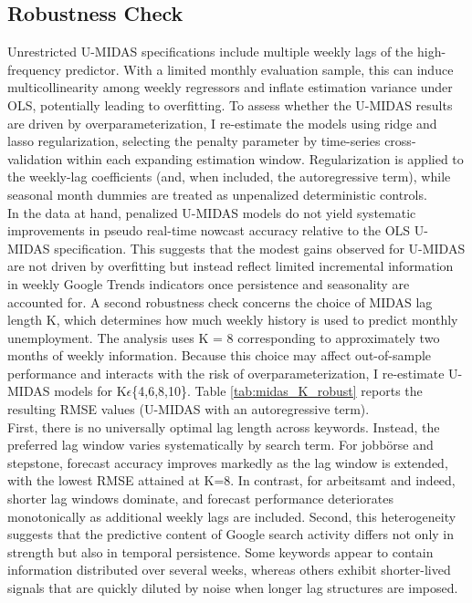 \documentclass[12pt,a4paper]{article}
\begin{document}
\subsection{Robustness Check}
Unrestricted U-MIDAS specifications include multiple weekly lags of the high-frequency predictor. With a limited monthly evaluation sample, this can induce multicollinearity among weekly regressors and inflate estimation variance under OLS, potentially leading to overfitting.
To assess whether the U-MIDAS results are driven by overparameterization, I re-estimate the models using ridge and lasso regularization, selecting the penalty parameter by time-series cross-validation within each expanding estimation window. Regularization is applied to the weekly-lag coefficients (and, when included, the autoregressive term), while seasonal month dummies are treated as unpenalized deterministic controls.\\
In the data at hand, penalized U-MIDAS models do not yield systematic improvements in pseudo real-time nowcast accuracy relative to the OLS U-MIDAS specification. This suggests that the modest gains observed for U-MIDAS are not driven by overfitting but instead reflect limited incremental information in weekly Google Trends indicators once persistence and seasonality are accounted for.
A second robustness check concerns the choice of MIDAS lag length K, which determines how much weekly history is used to predict monthly unemployment.
The analysis uses K = 8 corresponding to approximately two months of weekly information. Because this choice may affect out-of-sample performance and interacts with the risk of overparameterization, I re-estimate U-MIDAS models for K$\epsilon$\{4,6,8,10\}. Table \ref{tab:midas_K_robust} reports the resulting RMSE values (U-MIDAS with an autoregressive term).
\\First, there is no universally optimal lag length across keywords. Instead, the preferred lag window varies systematically by search term. For jobbörse and stepstone, forecast accuracy improves markedly as the lag window is extended, with the lowest RMSE attained at 
K=8. In contrast, for arbeitsamt and indeed, shorter lag windows dominate, and forecast performance deteriorates monotonically as additional weekly lags are included.
Second, this heterogeneity suggests that the predictive content of Google search activity differs not only in strength but also in temporal persistence. Some keywords appear to contain information distributed over several weeks, whereas others exhibit shorter-lived signals that are quickly diluted by noise when longer lag structures are imposed.
\end{document}
